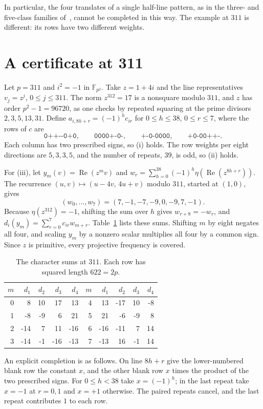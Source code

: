 \documentclass[11pt]{article}
\theoremstyle{remark}
\newcommand{\F}{\mathbb F}
\newcommand{\Rea}{\operatorname{Re}}
\begin{document}
In particular, the four translates of a single half-line pattern, as in the three- and five-class families of~\cite[Appendices~1--2]{LMS}, cannot be completed in this way. The example at $311$ is different: its rows have two different weights.

\section{A certificate at 311}\label{sec:cert}
Let $p=311$ and $i^2=-1$ in $\F_{p^2}$. Take $z=1+4i$ and the line representatives $v_j=z^j$, $0\le j\le311$. The norm $z^{312}=17$ is a nonsquare modulo $311$, and $z$ has order $p^2-1=96720$, as one checks by repeated squaring at the prime divisors $2,3,5,13,31$. Define $a_{i,8h+r}=(-1)^hc_{ir}$ for $0\le h\le38$, $0\le r\le7$, where the rows of $c$ are
\[
 \texttt{0++-{}-0+0},\qquad \texttt{0000+-0-},\qquad \texttt{+-0-0000},\qquad \texttt{+0-00++-}.
\]
Each column has two prescribed signs, so (i) holds. The row weights per eight directions are $5,3,3,5$, and the number of repeats, $39$, is odd, so (ii) holds.

For (iii), let $y_m(v)=\Rea(z^mv)$ and $w_r=\sum_{h=0}^{38}(-1)^h\eta(\Rea(z^{8h+r}))$. The recurrence $(u,v)\mapsto(u-4v,\,4u+v)$ modulo $311$, started at $(1,0)$, gives
\[
 (w_0,\ldots,w_7)=(7,-1,-7,-9,0,-9,7,-1).
\]
Because $\eta(z^{312})=-1$, shifting the sum over $h$ gives $w_{r+8}=-w_r$, and $d_i(y_m)=\sum_{r=0}^7c_{ir}w_{m+r}$. Table~\ref{tab:sums} lists these sums. Shifting $m$ by eight negates all four, and scaling $y_m$ by a nonzero scalar multiplies all four by a common sign. Since $z$ is primitive, every projective frequency is covered.
\begin{table}[ht]
\centering
\begin{tabular}{r|rrrr@{\qquad}r|rrrr}
\toprule
$m$&$d_1$&$d_2$&$d_3$&$d_4$&$m$&$d_1$&$d_2$&$d_3$&$d_4$\\
\midrule
0&8&10&17&13&4&13&-17&10&-8\\
1&-8&-9&6&21&5&21&-6&-9&8\\
2&-14&7&11&-16&6&-16&-11&7&14\\
3&-14&-1&-16&-13&7&-13&16&-1&14\\
\bottomrule
\end{tabular}
\caption{The character sums at $311$. Each row has squared length $622=2p$.}\label{tab:sums}
\end{table}

An explicit completion is as follows. On line $8h+r$ give the lower-numbered blank row the constant $x$, and the other blank row $x$ times the product of the two prescribed signs. For $0\le h<38$ take $x=(-1)^h$; in the last repeat take $x=-1$ at $r=0,1$ and $x=+1$ otherwise. The paired repeats cancel, and the last repeat contributes $1$ to each row.
\end{document}
